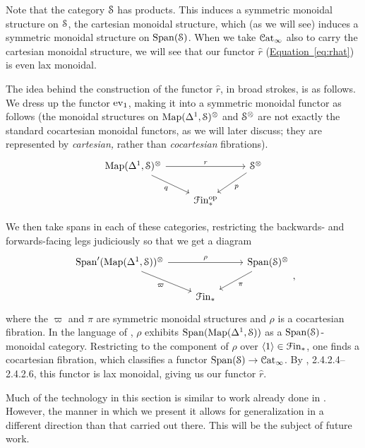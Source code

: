 \documentclass[main.tex]{subfiles}
\begin{document}
Note that the category $\S$ has products. This induces a symmetric monoidal structure on $\S$, the cartesian monoidal structure, which (as we will see) induces a symmetric monoidal structure on $\Span(\S)$. When we take $\Cat_{\infty}$ also to carry the cartesian monoidal structure, we will see that our functor $\hat{r}$ (\hyperref[eq:rhat]{Equation~\ref*{eq:rhat}}) is even lax monoidal.

The idea behind the construction of the functor $\hat{r}$, in broad strokes, is as follows. We dress up the functor $\ev_{1}$, making it into a symmetric monoidal functor as follows (the monoidal structures on $\Map(\Delta^{1}, \S)^{\otimes}$ and $\S^{\otimes}$ are not exactly the standard cocartesian monoidal functors, as we will later discuss; they are represented by \emph{cartesian,} rather than \emph{cocartesian} fibrations).
\begin{equation}
  \label{eq:wishlist_prq}
  \begin{tikzcd}
    \Map(\Delta^{1}, \S)^{\otimes}
    \arrow[rr, "r"]
    \arrow[dr, swap, "q"]
    && \S^{\otimes}
    \arrow[dl, "p"]
    \\
    & \Finp\op
  \end{tikzcd}
\end{equation}

We then take spans in each of these categories, restricting the backwards- and forwards-facing legs judiciously so that we get a diagram
\begin{equation}
  \label{eq:wishlist_pivarpirho}
  \begin{tikzcd}
    \Span'(\Map(\Delta^{1}, \S))^{\otimes}
    \arrow[rr, "\rho"]
    \arrow[dr, swap, "\varpi"]
    && \Span(\S)^{\otimes}
    \arrow[dl, "\pi"]
    \\
    & \Finp
  \end{tikzcd},
\end{equation}
where the $\varpi$ and $\pi$ are symmetric monoidal structures and $\rho$ is a cocartesian fibration. In the language of \cite{luriehigheralgebra}, $\rho$ exhibits $\Span(\Map(\Delta^{1}, \S))$ as a $\Span(\S)$-monoidal category. Restricting to the component of $\rho$ over $\langle 1 \rangle \in \Finp$, one finds a cocartesian fibration, which classifies a functor $\Span(\S) \to \ICat$. By \cite{luriehigheralgebra}, 2.4.2.4--2.4.2.6, this functor is lax monoidal, giving us our functor $\hat{r}$.

Much of the technology in this section is similar to work already done in \cite{spectralmackeyfunctors2}. However, the manner in which we present it allows for generalization in a different direction than that carried out there. This will be the subject of future work.
\end{document}
